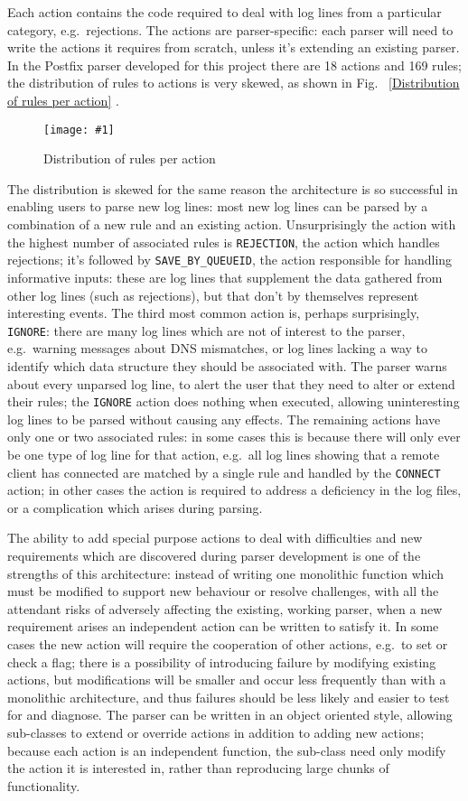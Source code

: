 \documentclass[draft]{svmult}
\newcommand{\showgraph}[3]{%
    \begin{figure}[hbt!]
        \caption{#2}\label{#3}
        \texttt{[image: \#1]}
    \end{figure}
}
\newcommand{\refwithpage}[1]{%
    \empty{}\vref{#1}%
}
\newcommand{\numberOFrules}[0]{%
    169%
}
\newcommand{\numberOFactions}[0]{%
    18%
}
\begin{document}
Each action contains the code required to deal with log lines from a
particular category, e.g.\ rejections.  The actions are parser-specific:
each parser will need to write the actions it requires from scratch, unless
it's extending an existing parser.  In the Postfix parser developed for
this project there are \numberOFactions{} actions and \numberOFrules{}
rules; the distribution of rules to actions is very skewed, as shown in
Fig.~\refwithpage{Distribution of rules per action}.
\showgraph{build/plot-action-distribution}{Distribution of rules per
action}{Distribution of rules per action} The distribution is skewed for
the same reason the architecture is so successful in enabling users to
parse new log lines: most new log lines can be parsed by a combination of a
new rule and an existing action.  Unsurprisingly the action with the
highest number of associated rules is \texttt{REJECTION}, the action which
handles rejections; it's followed by \texttt{SAVE\_BY\_QUEUEID}, the action
responsible for handling informative inputs: these are log lines that
supplement the data gathered from other log lines (such as rejections), but
that don't by themselves represent interesting events.  The third most
common action is, perhaps surprisingly, \texttt{IGNORE}: there are many log
lines which are not of interest to the parser, e.g.\ warning messages about
DNS mismatches, or log lines lacking a way to identify which data structure
they should be associated with.  The parser warns about every unparsed log
line, to alert the user that they need to alter or extend their rules; the
\texttt{IGNORE} action does nothing when executed, allowing uninteresting
log lines to be parsed without causing any effects.  The remaining actions
have only one or two associated rules: in some cases this is because there
will only ever be one type of log line for that action, e.g.\ all log lines
showing that a remote client has connected are matched by a single rule and
handled by the \texttt{CONNECT} action; in other cases the action is
required to address a deficiency in the log files, or a complication which
arises during parsing.

The ability to add special purpose actions to deal with difficulties and
new requirements which are discovered during parser development is one of
the strengths of this architecture: instead of writing one monolithic
function which must be modified to support new behaviour or resolve
challenges, with all the attendant risks of adversely affecting the
existing, working parser, when a new requirement arises an independent
action can be written to satisfy it.  In some cases the new action will
require the cooperation of other actions, e.g.\ to set or check a flag;
there is a possibility of introducing failure by modifying existing
actions, but modifications will be smaller and occur less frequently than
with a monolithic architecture, and thus failures should be less likely and
easier to test for and diagnose.  The parser can be written in an object
oriented style, allowing sub-classes to extend or override actions in
addition to adding new actions; because each action is an independent
function, the sub-class need only modify the action it is interested in,
rather than reproducing large chunks of functionality.
\end{document}

